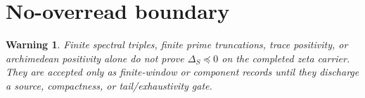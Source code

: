 \documentclass[11pt]{article}
\newtheorem{warning}{Warning}
\begin{document}
\section{No-overread boundary}
\begin{warning}
Finite spectral triples, finite prime truncations, trace positivity, or archimedean positivity alone do not prove $\Delta_S\preceq0$ on the completed zeta carrier.  They are accepted only as finite-window or component records until they discharge a source, compactness, or tail/exhaustivity gate.
\end{warning}
\end{document}
